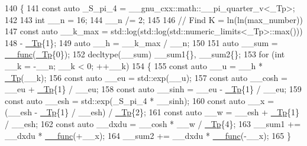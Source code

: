 \begin{DoxyCode}
140     \{
141       \textcolor{keyword}{const} \textcolor{keyword}{auto} \_S\_pi\_4 = \_\_gnu\_cxx::math::\_\_pi\_quarter\_v<\_Tp>;
142 
143       \textcolor{keywordtype}{int} \_\_n = 16;
144       \_\_n /= 2;
145 
146       \textcolor{comment}{// Find K = ln(ln(max\_number))}
147       \textcolor{keyword}{const} \textcolor{keyword}{auto} \_\_k\_max = std::log(std::log(std::numeric\_limits<\_Tp>::max()))
148                 - \hyperlink{namespace____gnu__cxx_a3b19a9c800ca194374ef9172290f7d79}{\_Tp}\{1\};
149       \textcolor{keyword}{auto} \_\_h = \_\_k\_max / \_\_n;
150 
151       \textcolor{keyword}{auto} \_\_sum = \hyperlink{namespace____gnu__cxx_af2b2f0c7a2ae72b922b1afefae5a65b2}{\_\_func}(\hyperlink{namespace____gnu__cxx_a3b19a9c800ca194374ef9172290f7d79}{\_Tp}\{0\});
152       decltype(\_\_sum) \_\_sum1\{\}, \_\_sum2\{\};
153       \textcolor{keywordflow}{for} (\textcolor{keywordtype}{int} \_\_k = -\_\_n; \_\_k < 0; ++\_\_k)
154         \{
155           \textcolor{keyword}{const} \textcolor{keyword}{auto} \_\_u = \_\_h * \hyperlink{namespace____gnu__cxx_a3b19a9c800ca194374ef9172290f7d79}{\_Tp}(\_\_k);
156           \textcolor{keyword}{const} \textcolor{keyword}{auto} \_\_eu = std::exp(\_\_u);
157           \textcolor{keyword}{const} \textcolor{keyword}{auto} \_\_cosh = \_\_eu + \hyperlink{namespace____gnu__cxx_a3b19a9c800ca194374ef9172290f7d79}{\_Tp}\{1\} / \_\_eu;
158           \textcolor{keyword}{const} \textcolor{keyword}{auto} \_\_sinh = \_\_eu - \hyperlink{namespace____gnu__cxx_a3b19a9c800ca194374ef9172290f7d79}{\_Tp}\{1\} / \_\_eu;
159           \textcolor{keyword}{const} \textcolor{keyword}{auto} \_\_esh = std::exp(\_S\_pi\_4 * \_\_sinh);
160           \textcolor{keyword}{const} \textcolor{keyword}{auto} \_\_x = (\_\_esh - \hyperlink{namespace____gnu__cxx_a3b19a9c800ca194374ef9172290f7d79}{\_Tp}\{1\} / \_\_esh) / \hyperlink{namespace____gnu__cxx_a3b19a9c800ca194374ef9172290f7d79}{\_Tp}\{2\};
161           \textcolor{keyword}{const} \textcolor{keyword}{auto} \_\_w = \_\_esh + \hyperlink{namespace____gnu__cxx_a3b19a9c800ca194374ef9172290f7d79}{\_Tp}\{1\} / \_\_esh;
162           \textcolor{keyword}{const} \textcolor{keyword}{auto} \_\_dxdu = \_\_cosh * \_\_w / \hyperlink{namespace____gnu__cxx_a3b19a9c800ca194374ef9172290f7d79}{\_Tp}\{4\};
163           \_\_sum1 += \_\_dxdu * \hyperlink{namespace____gnu__cxx_af2b2f0c7a2ae72b922b1afefae5a65b2}{\_\_func}(+\_\_x);
164           \_\_sum2 += \_\_dxdu * \hyperlink{namespace____gnu__cxx_af2b2f0c7a2ae72b922b1afefae5a65b2}{\_\_func}(-\_\_x);
165         \}

\end{DoxyCode}
